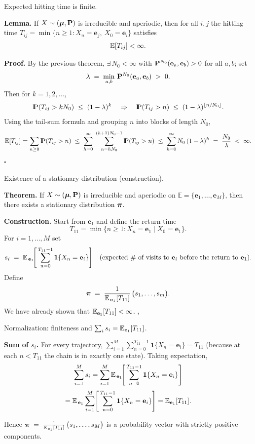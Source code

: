 \documentclass[aspectratio=169]{beamer}
\newcommand{\Prob}{{\rm I\hspace{-0.8mm}P}}
\newcommand{\e}[0]{\textbf{e}}
\newcommand{\E}[0]{\mathbb{E}}
\begin{document}
\begin{frame}{Expected hitting time is finite.}

\textbf{Lemma.}
If $X\sim(\mbox{\boldmath $\mu$},\mathbf{P})$ is irreducible and aperiodic, then for all $i,j$
the hitting time $T_{ij}=\min\{n\ge1: X_n=\e_j,\ X_0=\e_i\}$ satisfies
\[
\mathbb{E}[T_{ij}]<\infty .
\]

\textbf{Proof.}
By the previous theorem, $\exists\,N_0<\infty$ with
$\bfP^{N_0}(\e_a,\e_b)>0$ for all $a,b$; set
\[
\lambda \;=\; \min_{a,b}\,\bfP^{N_0}(\e_a,\e_b)\;>\;0.
\]
Then for $k=1,2,\dots$,
\[
\Prob(T_{ij}>kN_0)\;\le\; (1-\lambda)^k
\quad\Rightarrow\quad
\Prob(T_{ij}>n)\;\le\;(1-\lambda)^{\lfloor n/N_0\rfloor}.
\]
\pause
Using the tail-sum formula and grouping $n$ into blocks of length $N_0$,
\[
\Exp[T_{ij}]=\sum_{n\ge0}\Prob(T_{ij}>n)
\;\le\;\sum_{h=0}^{\infty}\;\sum_{n=hN_0}^{(h+1)N_0-1}\Prob(T_{ij}>n)
\;\le\;\sum_{h=0}^{\infty} N_0\,(1-\lambda)^h
\;=\;\frac{N_0}{\lambda}\;<\;\infty.
\]
\hfill$\square$

\end{frame}

\begin{frame}{Existence of a stationary distribution (construction).}

\textbf{Theorem.}
If $X\sim(\mbox{\boldmath $\mu$},\mathbf{P})$ is irreducible and aperiodic on $\E=\{\e_1,\dots,\e_M\}$,
then there exists a stationary distribution $\mbox{\boldmath$\pi$}$.
\medskip\par
\pause
\textbf{Construction.}
Start from $\e_1$ and define the return time
\[
T_{11}=\min\{n\ge1:X_n=\e_1\mid X_0=\e_1\}.
\]
For $i=1,\dots,M$ set
\[
s_i \;=\; \Exp_{\,\e_1}\!\Bigg[\sum_{n=0}^{T_{11}-1}\mathbf{1}\{X_n=\e_i\}\Bigg]
\quad\text{(expected \# of visits to $\e_i$ before the return to $\e_1$).}
\]
\pause
Define
\[
\bfpi \;=\; \frac1{\Exp_{\,\e_1}[T_{11}]}\,\big(s_1,\dots,s_m\big).
\]
 We have already shown that  $\Exp_{\e_1}[T_{11}]<\infty$.  ,

\end{frame}

\begin{frame}{Normalization: finiteness and $\sum_i s_i=\Exp_{\e_1}[T_{11}]$.}


\textbf{Sum of $s_i$.}
For every trajectory,
\(
\sum_{i=1}^M \sum_{n=0}^{T_{11}-1}\mathbf{1}\{X_n=\e_i\}=T_{11}
\)
(because at each $n<T_{11}$ the chain is in exactly one state).
Taking expectation,
$$
\sum_{i=1}^M s_i
=\sum_{i=1}^M  \Exp_{\,\e_1}\!\Bigg[\sum_{n=0}^{T_{11}-1}\mathbf{1}\{X_n=\e_i\}\Bigg]
$$
$$
= \Exp_{\,\e_1}\sum_{i=1}^M \!\Bigg[\sum_{n=0}^{T_{11}-1}\mathbf{1}\{X_n=\e_i\}\Bigg] =\Exp_{\e_1}[T_{11}].
$$

Hence $  \bfpi \;=\; \frac1{\Exp_{\,\e_1}[T_{11}]}\,\big(s_1,\dots,s_M\big)  $ is a probability vector with strictly positive components.
\end{frame}
\end{document}
